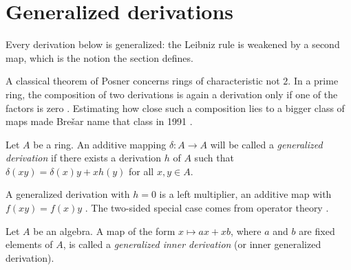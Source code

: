 \section{Generalized derivations}\label{sec:generalized-twisted:generalized}

Every derivation below is generalized: the Leibniz rule is weakened by a second map, which is the notion the section defines.

A classical theorem of Posner concerns rings of characteristic not $2$.
In a prime ring, the composition of two derivations is again a derivation only
if one of the factors is zero \cite[Theorem~2]{Posner1957}.
Estimating how close such a composition lies to a bigger class of maps made
Brešar name that class in 1991 \cite[p.~89]{Bresar1991Glasgow}.

\begin{definition}\label{def:gen:giderivation}
Let $A$ be a ring. An additive mapping $\delta\colon A\to A$ will be called a
\emph{generalized derivation} if there exists a derivation $h$ of $A$ such
that $\delta(xy)=\delta(x)y+xh(y)$ for all $x,y\in A$.
\end{definition}

A generalized derivation with $h=0$ is a left multiplier, an additive map
with $f(xy)=f(x)y$ \cite[p.~1148]{Hvala1998}. The two-sided special case
comes from operator theory \cite[p.~1147]{Hvala1998}.

\begin{definition}\label{def:gen:inner}
Let $A$ be an algebra. A map of the form $x\mapsto ax+xb$, where $a$ and $b$
are fixed elements of $A$, is called a \emph{generalized inner derivation}
(or inner generalized derivation).
\end{definition}


